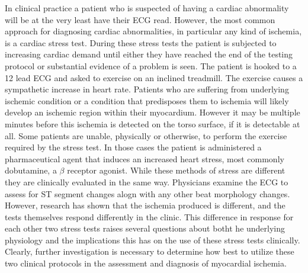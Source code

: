 \documentclass[12pt]{article}
\begin{document}
In clinical practice a patient who is suspected of having a cardiac abnormality will be at the very least have their ECG read. However, the most common approach for diagnosing cardiac abnormalities, in particular any kind of ischemia, is a cardiac stress test. During these stress tests the patient is subjected to increasing cardiac demand until either they have reached the end of the testing protocol or substantial evidence of a problem is seen. The patient is hooked to a 12 lead ECG and asked to exercise on an inclined treadmill. The exercise causes a sympathetic increase in heart rate. Patients who are suffering from underlying ischemic condition or a condition that predisposes them to ischemia will likely develop an ischemic region within their myocardium. However it may be multiple minutes before this ischemia is detected on the torso surface, if it is detectable at all.\cite{RSM:Goo2018} Some patients are unable, physically or otherwise, to perform the exercise required by the stress test. In those cases the patient is administered a pharmaceutical agent that induces an increased heart stress, most commonly dobutamine, a $\beta$ receptor agonist. While these methods of stress are different they are clinically evaluated in the same way. Physicians examine the ECG to assess for ST segment changes alogn with any other beat morphology changes. However, research has shown that the ischemia produced is different, and the tests themselves respond differently in the clinic.\cite{Zenger2019,Beleslin1994} This difference in response for each other two stress tests raises several questions about botht he underlying physiology and the implications this has on the use of these stress tests clinically. Clearly, further investigation is necessary to determine how best to utilize these two clinical protocols in the assessment and diagnosis of myocardial ischemia.
\end{document}
